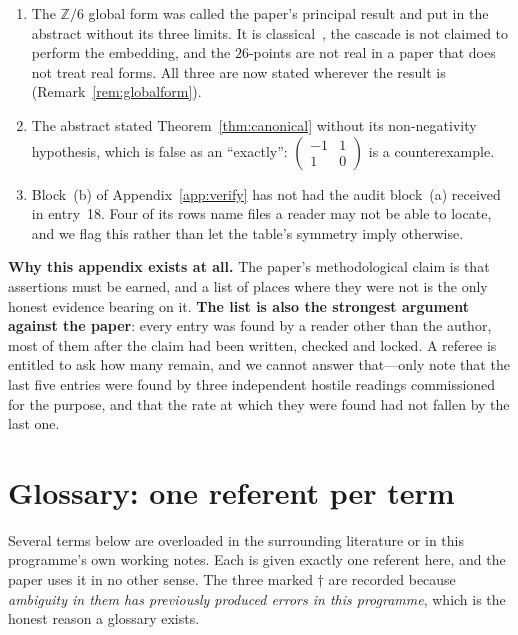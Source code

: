 \documentclass[11pt,reqno]{amsart}
\theoremstyle{plain}
\theoremstyle{definition}
\theoremstyle{remark}
\newcommand{\Z}{\mathbb{Z}}
\begin{document}
\begin{enumerate}[leftmargin=2.2em,itemsep=1pt]
\item The $\Z/6$ global form was called the paper's principal result and put in the
  abstract without its three limits. It is classical~\cite{GeorgiGlashow,Hucks,BaezHuerta,Tong},
  the cascade is not claimed to perform the embedding, and the $26$-points are not real
  in a paper that does not treat real forms. All three are now stated wherever the result
  is (Remark~\ref{rem:globalform}).

\item The abstract stated Theorem~\ref{thm:canonical} without its non-negativity
  hypothesis, which is false as an ``exactly'': $\left(\begin{smallmatrix}-1&1\\1&0\end{smallmatrix}\right)$
  is a counterexample.

\item Block~(b) of Appendix~\ref{app:verify} has not had the audit block~(a) received in
  entry~18. Four of its rows name files a reader may not be able to locate, and we flag
  this rather than let the table's symmetry imply otherwise.
\end{enumerate}

\textbf{Why this appendix exists at all.} The paper's methodological claim is that
assertions must be earned, and a list of places where they were not is the only honest
evidence bearing on it. \textbf{The list is also the strongest argument against the
paper}: every entry was found by a reader other than the author, most of them after the
claim had been written, checked and locked. A referee is entitled to ask how many remain,
and we cannot answer that---only note that the last five entries were found by three
independent hostile readings commissioned for the purpose, and that the rate at which
they were found had not fallen by the last one.

\section{Glossary: one referent per term}\label{app:glossary}

Several terms below are overloaded in the surrounding literature or in this programme's
own working notes. Each is given exactly one referent here, and the paper uses it in no
other sense. The three marked $\dagger$ are recorded because \emph{ambiguity in them has
previously produced errors in this programme}, which is the honest reason a glossary
exists.
\end{document}
